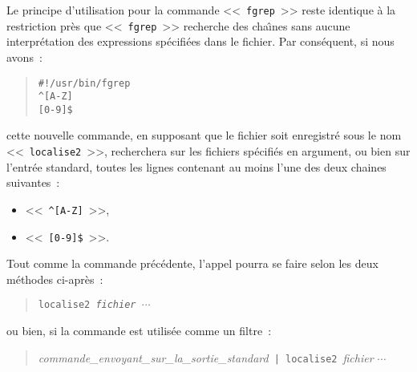Le principe d'utilisation pour la commande <<~{\tt fgrep}~>> reste identique {\`a} la
restriction pr{\`e}s que <<~{\tt fgrep}~>> recherche des cha{\^\i}nes sans aucune
interpr{\'e}tation des expressions sp{\'e}cifi{\'e}es dans le fichier. Par cons{\'e}quent, si nous
avons~:
\begin{quote}
\begin{verbatim}
#!/usr/bin/fgrep
^[A-Z]
[0-9]$
\end{verbatim}
\end{quote}
cette nouvelle commande, en supposant que le fichier soit enregistr{\'e} sous le nom
<<~{\tt localise2}~>>, recherchera sur les fichiers sp{\'e}cifi{\'e}s en argument, ou
bien sur l'entr{\'e}e standard, toutes les lignes contenant au moins l'une des deux
chaines suivantes~:
\begin{itemize}
	\item	<<~\verb=^[A-Z]=~>>,
	\item	<<~\verb=[0-9]$=~>>.
\end{itemize}

Tout comme la commande pr{\'e}c{\'e}dente, l'appel pourra se faire selon les deux
m{\'e}thodes ci-apr{\`e}s~:
\begin{quote}
{\tt localise2~{\sl fichier $\cdots$}}
\end{quote}
ou bien, si la commande est utilis{\'e}e comme un filtre~:
\begin{quote}
{\sl commande\_envoyant\_sur\_la\_sortie\_standard}~\verb=| localise2=~{\sl fichier $\cdots$}
\end{quote}
